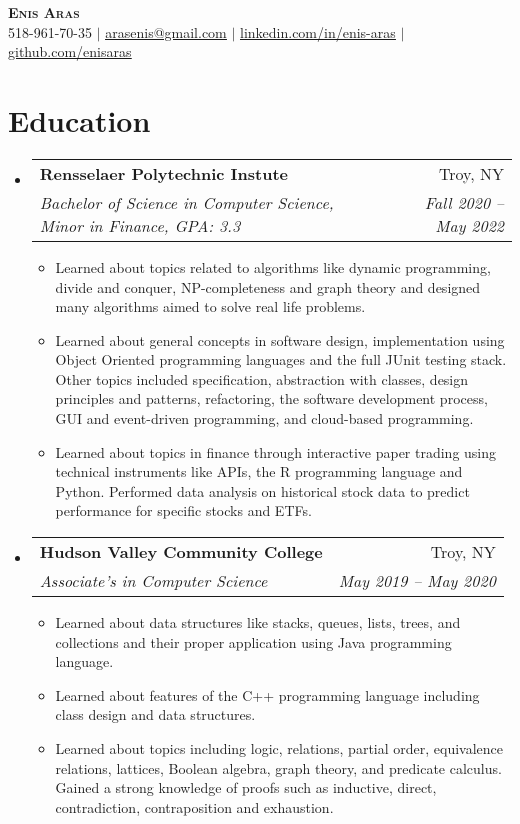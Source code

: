 \documentclass[letterpaper,11pt]{article}
\makeatletter
\newcommand{\resumeItem}[1]{
  \item\small{
    {#1 \vspace{-2pt}}
  }
}
\newcommand{\resumeSubheading}[4]{
  \vspace{-2pt}\item
    \begin{tabular*}{0.97\textwidth}[t]{l@{\extracolsep{\fill}}r}
      \textbf{#1} & #2 \\
      \textit{\small#3} & \textit{\small #4} \\
    \end{tabular*}\vspace{-7pt}
}
\newcommand{\resumeSubHeadingListStart}{\begin{itemize}[leftmargin=0.15in, label={}]}
\newcommand{\resumeSubHeadingListEnd}{\end{itemize}}
\newcommand{\resumeItemListStart}{\begin{itemize}}
\newcommand{\resumeItemListEnd}{\end{itemize}\vspace{-5pt}}
\makeatother
\begin{document}

\begin{center}
    \textbf{\Huge \scshape Enis Aras} \\ \vspace{1pt}
    \small 518-961-70-35 $|$ \href{mailto: arasenis@gmail.com}{\underline{arasenis@gmail.com}} $|$ 
    \href{https://linkedin.com/in/enis-aras}{\underline{linkedin.com/in/enis-aras}} $|$
    \href{https://github.com/enisaras}{\underline{github.com/enisaras}}
\end{center}


\section{Education}
  \resumeSubHeadingListStart
    \resumeSubheading
      {Rensselaer Polytechnic Instute}{Troy, NY}
      {Bachelor of Science in Computer Science, Minor in Finance, GPA: 3.3}{Fall 2020 -- May 2022}
      
      \resumeItemListStart
       \resumeItem{Learned about topics related to algorithms like dynamic programming, divide and conquer, NP-completeness and graph theory and designed many algorithms aimed to solve real life problems.}
       \resumeItem{Learned about general concepts in software design, implementation using Object Oriented programming languages and the full JUnit testing stack. Other topics included specification, abstraction with classes, design principles and patterns, refactoring, the software development process, GUI and event-driven programming, and cloud-based programming.}
       \resumeItem{Learned about topics in finance through interactive paper trading using technical instruments like APIs, the R programming language and Python. Performed data analysis on historical stock data to predict performance for specific stocks and ETFs. }
       \resumeItemListEnd
    \resumeSubheading
      {Hudson Valley Community College}{Troy, NY}
      {Associate's in Computer Science}{May 2019 -- May 2020}
        \resumeItemListStart
        \resumeItem{Learned about data structures like stacks, queues, lists, trees, and collections and their proper application using Java programming language.}
        \resumeItem{Learned about features of the C++ programming language including class design and data structures.}
       \resumeItem{Learned about topics including logic, relations, partial order, equivalence relations, lattices, Boolean algebra, graph theory, and predicate calculus. Gained a strong knowledge of proofs such as inductive, direct, contradiction, contraposition and exhaustion.}
       \resumeItemListEnd
  \resumeSubHeadingListEnd
\end{document}
